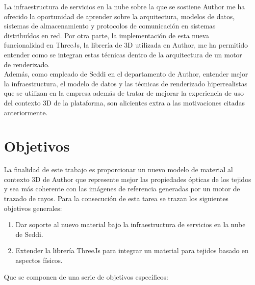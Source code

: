 La infraestructura de servicios en la nube sobre la que se sostiene Author me ha ofrecido la oportunidad de
aprender sobre la arquitectura, modelos de datos, sistemas de almacenamiento y protocolos de comunicaci\'on en sistemas distribu\'idos
en red. Por otra parte, la implementaci\'on de esta nueva funcionalidad en ThreeJs, la librer\'ia de 3D utilizada en Author,
me ha permitido entender como se integran estas t\'ecnicas dentro de la arquitectura de un motor de renderizado.\\

Adem\'as, como empleado de Seddi en el departamento de Author, entender mejor la infraestructura, el modelo de datos y las t\'ecnicas
de renderizado hiperrealistas que se utilizan en la empresa adem\'as de tratar de mejorar la experiencia de uso del contexto 3D de
la plataforma, son alicientes extra a las motivaciones citadas anteriormente.

\section{Objetivos}

La finalidad de este trabajo es proporcionar un nuevo modelo de material al contexto 3D de Author que represente mejor las propiedades
\'opticas de los tejidos y sea m\'as coherente con las im\'agenes de referencia generadas por un motor de trazado de rayos. Para la
consecuci\'on de esta tarea se trazan los siguientes objetivos generales:

\begin{enumerate}[label=(\roman*)]
	\item Dar soporte al nuevo material bajo la infraestructura de servicios en la nube de Seddi.
	\item Extender la librer\'ia ThreeJs para integrar un material para tejidos basado en aspectos f\'isicos.
\end{enumerate}

Que se componen de una serie de objetivos espec\'ificos:

